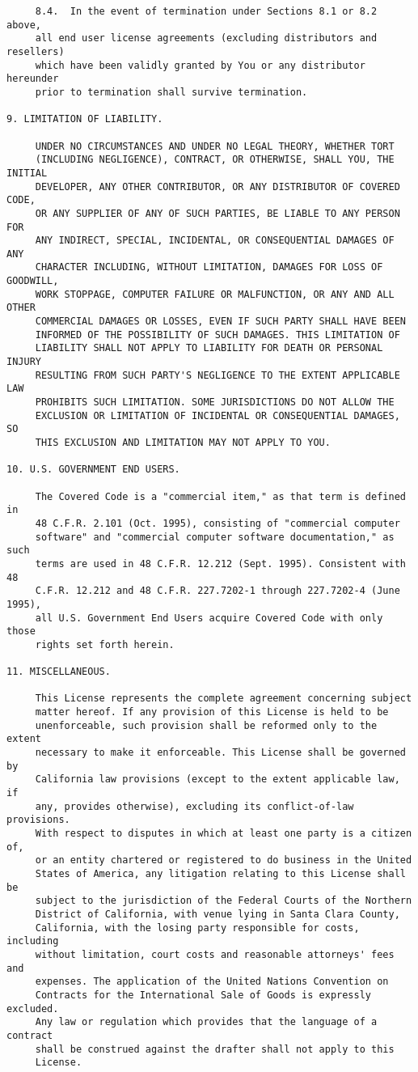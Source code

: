 \begin{verbatim}
     8.4.  In the event of termination under Sections 8.1 or 8.2 above,
     all end user license agreements (excluding distributors and resellers)
     which have been validly granted by You or any distributor hereunder
     prior to termination shall survive termination.

9. LIMITATION OF LIABILITY.

     UNDER NO CIRCUMSTANCES AND UNDER NO LEGAL THEORY, WHETHER TORT
     (INCLUDING NEGLIGENCE), CONTRACT, OR OTHERWISE, SHALL YOU, THE INITIAL
     DEVELOPER, ANY OTHER CONTRIBUTOR, OR ANY DISTRIBUTOR OF COVERED CODE,
     OR ANY SUPPLIER OF ANY OF SUCH PARTIES, BE LIABLE TO ANY PERSON FOR
     ANY INDIRECT, SPECIAL, INCIDENTAL, OR CONSEQUENTIAL DAMAGES OF ANY
     CHARACTER INCLUDING, WITHOUT LIMITATION, DAMAGES FOR LOSS OF GOODWILL,
     WORK STOPPAGE, COMPUTER FAILURE OR MALFUNCTION, OR ANY AND ALL OTHER
     COMMERCIAL DAMAGES OR LOSSES, EVEN IF SUCH PARTY SHALL HAVE BEEN
     INFORMED OF THE POSSIBILITY OF SUCH DAMAGES. THIS LIMITATION OF
     LIABILITY SHALL NOT APPLY TO LIABILITY FOR DEATH OR PERSONAL INJURY
     RESULTING FROM SUCH PARTY'S NEGLIGENCE TO THE EXTENT APPLICABLE LAW
     PROHIBITS SUCH LIMITATION. SOME JURISDICTIONS DO NOT ALLOW THE
     EXCLUSION OR LIMITATION OF INCIDENTAL OR CONSEQUENTIAL DAMAGES, SO
     THIS EXCLUSION AND LIMITATION MAY NOT APPLY TO YOU.

10. U.S. GOVERNMENT END USERS.

     The Covered Code is a "commercial item," as that term is defined in
     48 C.F.R. 2.101 (Oct. 1995), consisting of "commercial computer
     software" and "commercial computer software documentation," as such
     terms are used in 48 C.F.R. 12.212 (Sept. 1995). Consistent with 48
     C.F.R. 12.212 and 48 C.F.R. 227.7202-1 through 227.7202-4 (June 1995),
     all U.S. Government End Users acquire Covered Code with only those
     rights set forth herein.

11. MISCELLANEOUS.

     This License represents the complete agreement concerning subject
     matter hereof. If any provision of this License is held to be
     unenforceable, such provision shall be reformed only to the extent
     necessary to make it enforceable. This License shall be governed by
     California law provisions (except to the extent applicable law, if
     any, provides otherwise), excluding its conflict-of-law provisions.
     With respect to disputes in which at least one party is a citizen of,
     or an entity chartered or registered to do business in the United
     States of America, any litigation relating to this License shall be
     subject to the jurisdiction of the Federal Courts of the Northern
     District of California, with venue lying in Santa Clara County,
     California, with the losing party responsible for costs, including
     without limitation, court costs and reasonable attorneys' fees and
     expenses. The application of the United Nations Convention on
     Contracts for the International Sale of Goods is expressly excluded.
     Any law or regulation which provides that the language of a contract
     shall be construed against the drafter shall not apply to this
     License.


\end{verbatim}
